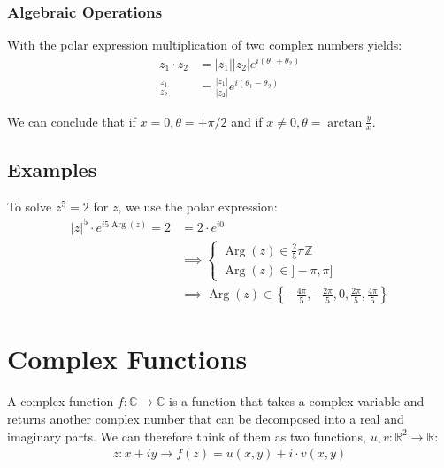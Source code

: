 \subsubsection{Algebraic Operations}
With the polar expression multiplication of two complex numbers yields:
\begin{equation*}
\begin{split}
    z_1\cdot z_2 &= |z_1||z_2|e^{i(\theta_1+\theta_2)}\\
    \frac{z_1}{z_2} &= \frac{|z_1|}{|z_2|}e^{i(\theta_1-\theta_2)} 
\end{split}
\end{equation*}

We can conclude that if $x=0, \theta =\pm\pi/2$ and if $x\ne 0, \theta = \arctan\frac yx$.

\subsection{Examples}
To solve $z^5=2$ for $z$, we use the polar expression:
\begin{equation*}
\begin{split}
|z|^5 \cdot e^{i5\operatorname{Arg}(z)}=2&=2\cdot e^{i0}\\
&\implies
\begin{cases}
    \operatorname{Arg}(z) \in \frac 25\pi \mathbb Z\\
    \operatorname{Arg}(z) \in]-\pi,\pi]
\end{cases}\\
&\implies
\operatorname{Arg}(z)\in\left\{-\frac{4\pi}5,-\frac{2\pi}5 , 0, \frac{2\pi}5, \frac{4\pi}{5}\right\}
\end{split}
\end{equation*}

\section{Complex Functions}
A complex function $f: \mathbb C \to\mathbb C$ is a function that takes a complex variable and returns another complex number that can be decomposed into a real and imaginary parts. We can therefore think of them as two functions, $u, v: \mathbb R^2 \to \mathbb R$:
\begin{equation*}
\begin{split}
z:x+iy\to f(z)=u(x,y)+i\cdot v(x,y)
\end{split}
\end{equation*}

